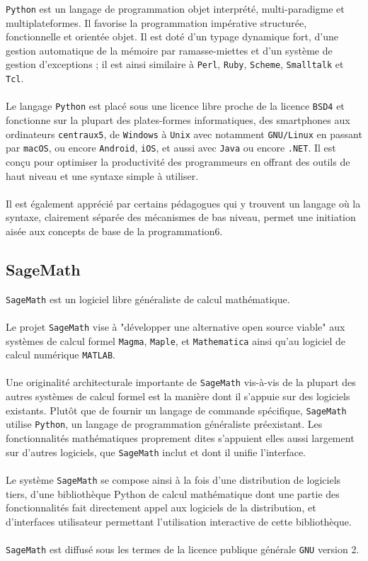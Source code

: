\documentclass[]{article}
\begin{document}
\texttt{Python} est un langage de programmation objet interprété, multi-paradigme et multiplateformes. Il favorise la programmation impérative structurée, fonctionnelle et orientée objet. Il est doté d'un typage dynamique fort, d'une gestion automatique de la mémoire par ramasse-miettes et d'un système de gestion d'exceptions ; il est ainsi similaire à \texttt{Perl}, \texttt{Ruby}, \texttt{Scheme}, \texttt{Smalltalk} et \texttt{Tcl}.\\
\\
Le langage \texttt{Python} est placé sous une licence libre proche de la licence \texttt{BSD4} et fonctionne sur la plupart des plates-formes informatiques, des smartphones aux ordinateurs \texttt{centraux5}, de \texttt{Windows} à \texttt{Unix} avec notamment \texttt{GNU/Linux} en passant par \texttt{macOS}, ou encore \texttt{Android}, \texttt{iOS}, et aussi avec \texttt{Java} ou encore \texttt{.NET}. Il est conçu pour optimiser la productivité des programmeurs en offrant des outils de haut niveau et une syntaxe simple à utiliser.\\
\\
Il est également apprécié par certains pédagogues qui y trouvent un langage où la syntaxe, clairement séparée des mécanismes de bas niveau, permet une initiation aisée aux concepts de base de la programmation6. 

\subsection{SageMath}

\texttt{SageMath} est un logiciel libre généraliste de calcul mathématique.\\
\\
Le projet \texttt{SageMath} vise à "développer une alternative open source viable" aux systèmes de calcul formel \texttt{Magma}, \texttt{Maple}, et \texttt{Mathematica} ainsi qu'au logiciel de calcul numérique \texttt{MATLAB}.\\
\\
Une originalité architecturale importante de \texttt{SageMath} vis-à-vis de la plupart des autres systèmes de calcul formel est la manière dont il s'appuie sur des logiciels existants. Plutôt que de fournir un langage de commande spécifique, \texttt{SageMath} utilise \texttt{Python}, un langage de programmation généraliste préexistant. Les fonctionnalités mathématiques proprement dites s'appuient elles aussi largement sur d'autres logiciels, que \texttt{SageMath} inclut et dont il unifie l'interface.\\
\\
Le système \texttt{SageMath} se compose ainsi à la fois d'une distribution de logiciels tiers, d'une bibliothèque Python de calcul mathématique dont une partie des fonctionnalités fait directement appel aux logiciels de la distribution, et d'interfaces utilisateur permettant l'utilisation interactive de cette bibliothèque.\\
\\
\texttt{SageMath} est diffusé sous les termes de la licence publique générale \texttt{GNU} version 2.
\end{document}
